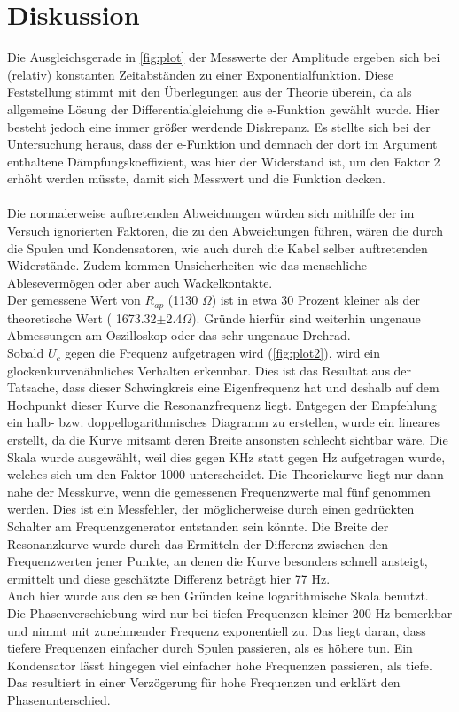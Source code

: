 \section{Diskussion}
\label{sec:Diskussion}

Die Ausgleichsgerade in \autoref{fig:plot} der Messwerte der Amplitude ergeben sich bei (relativ) konstanten Zeitabständen zu einer Exponentialfunktion. 
Diese Feststellung stimmt mit den Überlegungen aus der Theorie überein, da als allgemeine Lösung der Differentialgleichung die e-Funktion gewählt wurde. 
Hier besteht jedoch eine immer größer werdende Diskrepanz. 
Es stellte sich bei der Untersuchung heraus, dass der e-Funktion und demnach der dort im Argument enthaltene Dämpfungskoeffizient, was hier der Widerstand ist, um den Faktor 2 erhöht werden müsste, damit sich Messwert und die Funktion decken. 
\\
\
\\
Die normalerweise auftretenden Abweichungen würden sich mithilfe der im Versuch ignorierten Faktoren, die zu den Abweichungen führen, wären die durch die Spulen und Kondensatoren, wie auch durch die Kabel selber auftretenden Widerstände. 
Zudem kommen Unsicherheiten wie das menschliche Ablesevermögen oder aber auch Wackelkontakte.
\\
Der gemessene Wert von \(R_{ap}\) (1130 \(\Omega\)) ist in etwa 30 Prozent kleiner als der theoretische Wert ( 1673.32\(\pm\)2.4\(\Omega\)). %
Gründe hierfür sind weiterhin ungenaue Abmessungen am Oszilloskop oder das sehr ungenaue Drehrad.
\\
Sobald \(U_c\) gegen die Frequenz aufgetragen wird (\autoref{fig:plot2}), wird ein glockenkurvenähnliches Verhalten erkennbar. 
Dies ist das Resultat aus der Tatsache, dass dieser Schwingkreis eine Eigenfrequenz hat und deshalb auf dem Hochpunkt dieser Kurve die Resonanzfrequenz liegt. 
Entgegen der Empfehlung ein halb- bzw. doppellogarithmisches Diagramm zu erstellen, wurde ein lineares erstellt, da die Kurve mitsamt deren Breite ansonsten schlecht sichtbar wäre. 
Die Skala wurde ausgewählt, weil dies gegen KHz statt gegen Hz aufgetragen wurde, welches sich um den Faktor 1000 unterscheidet.
Die Theoriekurve liegt nur dann nahe der Messkurve, wenn die gemessenen Frequenzwerte mal fünf genommen werden. 
Dies ist ein Messfehler, der möglicherweise durch einen gedrückten Schalter am Frequenzgenerator entstanden sein könnte.
Die Breite der Resonanzkurve wurde durch das Ermitteln der Differenz zwischen den Frequenzwerten jener Punkte, an denen die Kurve besonders schnell ansteigt, ermittelt und diese geschätzte Differenz beträgt hier 77 Hz. 
\\
Auch hier wurde aus den selben Gründen keine logarithmische Skala benutzt.
\\
Die Phasenverschiebung wird nur bei tiefen Frequenzen kleiner 200 Hz bemerkbar und nimmt mit zunehmender Frequenz exponentiell zu. 
Das liegt daran, dass tiefere Frequenzen einfacher durch Spulen passieren, als es höhere tun. 
Ein Kondensator lässt hingegen viel einfacher hohe Frequenzen passieren, als tiefe.
Das resultiert in einer Verzögerung für hohe Frequenzen und erklärt den Phasenunterschied.
